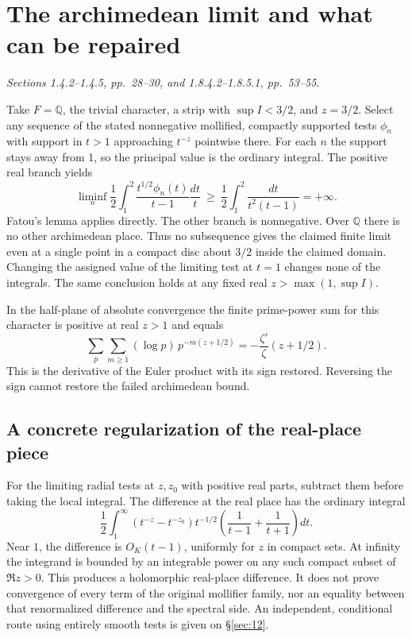 \documentclass[11pt,reqno]{amsart}
\numberwithin{equation}{section}
\newcommand{\Q}{\mathbb Q}\newcommand{\R}{\mathbb R}\newcommand{\C}{\mathbb C}\newcommand{\Z}{\mathbb Z}
\begin{document}
\section{The archimedean limit and what can be repaired}\label{sec:10}

\textit{Sections 1.4.2--1.4.5, pp.~28--30, and 1.8.4.2--1.8.5.1, pp.~53--55.}\par
Take \(F=\Q\), the trivial character, a strip with \(\sup I<3/2\), and \(z=3/2\). Select any sequence of the stated nonnegative mollified, compactly supported tests \(\phi_n\) with support in \(t>1\) approaching \(t^{-z}\) pointwise there. For each \(n\) the support stays away from 1, so the principal value is the ordinary integral. The positive real branch yields
\[
  \liminf_n\frac12\int_1^2\frac{t^{1/2}\phi_n(t)}{t-1}\frac{dt}{t}
       \ \ge\ \frac12\int_1^2\frac{dt}{t^2(t-1)}=+\infty .
\]
Fatou's lemma applies directly. The other branch is nonnegative. Over \(\Q\) there is no other archimedean place. Thus no subsequence gives the claimed finite limit even at a single point in a compact disc about \(3/2\) inside the claimed domain. Changing the assigned value of the limiting test at \(t=1\) changes none of the integrals. The same conclusion holds at any fixed real \(z>\max(1,\sup I)\).

In the half-plane of absolute convergence the finite prime-power sum for this character is positive at real \(z>1\) and equals
\[
    \sum_p\sum_{m\ge1}(\log p)\,p^{-m(z+1/2)}
        =-\frac{\zeta'}{\zeta}(z+1/2).
\]
This is the derivative of the Euler product with its sign restored. Reversing the sign cannot restore the failed archimedean bound.

\subsection*{A concrete regularization of the real-place piece}
For the limiting radial tests at \(z,z_0\) with positive real parts, subtract them before taking the local integral. The difference at the real place has the ordinary integral
\[
 \frac12\int_1^\infty
 (t^{-z}-t^{-z_0})t^{-1/2}
 \left(\frac1{t-1}+\frac1{t+1}\right)dt .
\]
Near \(1\), the difference is \(O_K(t-1)\), uniformly for \(z\) in compact sets. At infinity the integrand is bounded by an integrable power on any such compact subset of \(\Re z>0\). This produces a holomorphic real-place difference. It does not prove convergence of every term of the original mollifier family, nor an equality between that renormalized difference and the spectral side. An independent, conditional route using entirely smooth tests is given on \S\ref{sec:12}.
\end{document}
